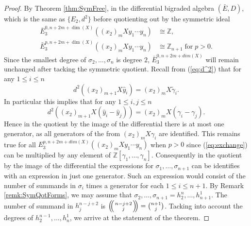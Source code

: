 \documentclass{article}
\theoremstyle{plain}
\theoremstyle{definition}
\numberwithin{thm}{section}
\begin{document}
			\begin{proof}
				By Theorem \ref{thm:SymFree}, in the differential bigraded algebra $(\bar{E},D)$, which is the same as $\{ E_2,d^2\}$ 
				before quotienting out by the symmetric ideal 
				\begin{align*}
					\bar{E}_{3}^{0,n+2m+\dim(X)}((x_2)_m X y_1\cdots y_n)&\cong\mathbb{Z}, \\
					\bar{E}_{3}^{p,n+2m+\dim(X)}((x_2)_m X y_1\cdots y_n)&\cong\mathbb{Z}_{n+1} \; \text{for} \; p>0.
				\end{align*}
				Since the smallest degree of $\sigma_2,\dots,\sigma_n$ is degree $2$,
				$\bar{E}_{3}^{0,n+2m+dim(X)}$ will remain unchanged after tacking the symmetric quotient. 
				Recall from (\ref{eq:d^2}) that for any $1\leq i \leq n$
				\begin{equation*}
					d^2((x_2)_{m+1}X\hat{y}_{i})=(x_2)_mX\tilde{\gamma}_i.
				\end{equation*}
				In particular this implies that for any $1\leq i,j \leq n$
				\begin{equation}\label{eq:exchange}
					d^2((x_2)_{m+1}X(\hat{y}_i-\hat{y}_j))=(x_2)_mX(\gamma_i-\gamma_j).
				\end{equation}
				Hence in the quotient by the image of the differential there is at most one generator, as all generators of the from $(x_2)_mX\gamma_i$ are identified.
				This remains true for all $E_3^{p,n+2m+dim(X)}((x_2)_{m}X y_1\cdots y_n)$ when $p>0$ since (\ref{eq:exchange})
				can be multiplied by any element of $\mathbb{Z}[\gamma_1,\dots,\gamma_n]$.
				Consequently in the quotient by the image of the differential the expressions for $\sigma_1,\dots,\sigma_{n+1}$
				can be identifies with an expression in just one generator.
				Such an expression would consist of the number of summands in $\sigma_i$ times a generator for each $1\leq i \leq n+1$.
				By Remark \ref{remk:SymQotForms}, we may assume that $\sigma_2,\dots,\sigma_{n+1}=h_2^{n},\dots,h_{n+1}^1$.
				The number of summand in $h_j^{n-j+2}$ is ${\ensuremath{\left(\kern-.3em\left(\genfrac{}{}{0pt}{}{{n-j+2}}{{j}}\right)\kern-.3em\right)}}=\binom{n+1}{j}$.
				Tacking into account the degrees of $h_2^{n-1},\dots,h_n^1$, we arrive at the statement of the theorem.
				
			\end{proof}
			
\end{document}
